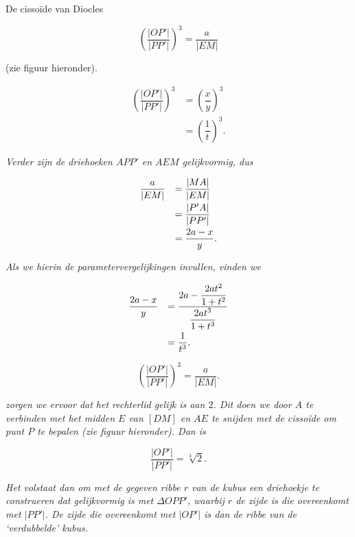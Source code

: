 \begin{lesactiviteit}{De cissoïde van Diocles}
\begin{vraagenantwoord} [resume]
    $$\left(\frac{|OP'|}{|PP'|}\right)^3=\frac{a}{|EM|}$$
    
    (zie figuur hieronder).
    
    
    $$
    \begin{array}{ll}
    \left(\dfrac{|OP'|}{|PP'|}\right)^3&=\left(\dfrac{x}{y}\right)^3\\
    &=\left(\dfrac{1}{t}\right)^3.
    \end{array}
    $$
    
    \emph{Verder zijn de driehoeken $APP'$ en $AEM$ gelijkvormig, dus}
     
    $$
    \begin{array}{ll}
    \dfrac{a}{|EM|}&=\dfrac{|MA|}{|EM|}
    \vspace{1mm}\\
    &=\dfrac{|P'A|}{|PP'|}
    \vspace{1mm}\\
    &=\dfrac{2a-x}{y}.
    \end{array}
    $$
     
    \emph{Als we hierin de parametervergelijkingen invullen, vinden we}
    
    $$
    \begin{array}{ll}
    \dfrac{2a-x}{y}&=\dfrac{2a-\dfrac{2at^2}{1+t^2}}{\dfrac{2at^3}{1+t^3}}
    \vspace{1mm}\\
    &=\dfrac{1}{t^3}.
    \end{array}
    $$
   
    
     $$\left(\frac{|OP'|}{|PP'|}\right)^3=\frac{a}{|EM|}.$$
    
    \emph{zorgen we ervoor dat het rechterlid gelijk is aan $2$. Dit doen we door $A$ te verbinden met het midden $E$ van $[DM]$ en $AE$ te snijden met de cissoïde om punt $P$ te bepalen (zie figuur hieronder). Dan is}
    
    $$\frac{|OP'|}{|PP'|}=\sqrt[3]{2}.$$
    
      
    \emph{Het volstaat dan om met de gegeven ribbe $r$ van de kubus een driehoekje te construeren dat gelijkvormig is met $\Delta OPP'$, waarbij $r$ de zijde is die overeenkomt met $|PP'|$. De zijde die overeenkomt met $|OP'|$ is dan de ribbe van de `verdubbelde' kubus.}
    
\end{vraagenantwoord}
        


\end{lesactiviteit}

